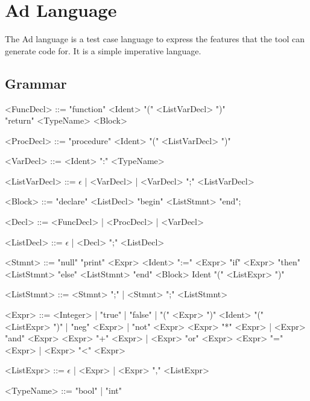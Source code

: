 \appendix
\chapter{Ad Language}
The Ad language is a test case language to express the features that the tool can generate code for.
It is a simple imperative language.
\section{Grammar}
\begin{grammar}
    <FuncDecl> ::= "function" <Ident> "(" <ListVarDecl> ")"
    \\"return" <TypeName> <Block>
    
    <ProcDecl> ::= "procedure" <Ident> "(" <ListVarDecl> ")"

    <VarDecl> ::= <Ident> ":" <TypeName>

    <ListVarDecl> ::= $\epsilon$ | <VarDecl> | <VarDecl> ";" <ListVarDecl>

    <Block> ::= "declare" <ListDecl> "begin" <ListStmnt> "end";

    <Decl> ::= <FuncDecl> | <ProcDecl> | <VarDecl>

    <ListDecl> ::= $\epsilon$ | <Decl> ";" <ListDecl>

    <Stmnt> ::= "null"
    \alt "print" <Expr>
    \alt <Ident> ":=" <Expr>
    \alt "if" <Expr> "then" <ListStmnt> "else" <ListStmnt> "end"
    \alt <Block>
    \alt Ident "(" <ListExpr> ")"

    <ListStmnt> ::= <Stmnt> ";" | <Stmnt> ";" <ListStmnt>

    <Expr> ::= <Integer> | "true" | "false" | "(" <Expr> ")"
    \alt <Ident> "(" <ListExpr> ")" | "neg" <Expr> | "not" <Expr>
    \alt <Expr> "*" <Expr> | <Expr> "and" <Expr>
    \alt <Expr> "+" <Expr> | <Expr> "or" <Expr>
    \alt <Expr> "=" <Expr> | <Expr> "<" <Expr>

    <ListExpr> ::= $\epsilon$ | <Expr> | <Expr> "," <ListExpr>

    <TypeName> ::= "bool" | "int"
\end{grammar}

